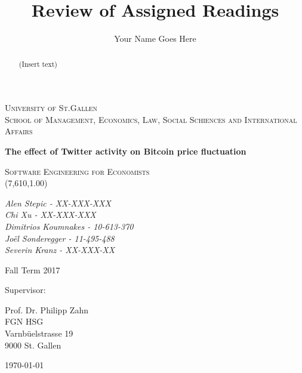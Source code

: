 \documentclass[a4paper,american,12pt]{article}
\title{Review of Assigned Readings}
\author{Your Name Goes Here}
\begin{document}
    \begin{titlepage}
    \centering
    {\scshape\LARGE University of St.Gallen \\ \large School of Management, Economics, Law, Social Schiences and International Affairs \par}
    \vspace{2.0cm}
    {\huge\bfseries The effect of Twitter activity on Bitcoin price fluctuation  \par}
	\vspace{2.0cm}
    {\scshape\Large Software Engineering for Economists \\(7,610,1.00) \par}
    \vspace{2.0cm}
    {\itshape\large Alen Stepic - XX-XXX-XXX \\Chi Xu - XX-XXX-XXX \\Dimitrios Koumnakes - 10-613-370 \\Joël Sonderegger - 11-495-488 \\Severin Kranz - XX-XXX-XX \par}
    	\begin{spacing}{1}
    	\vspace{1.2cm}
    	{Fall Term 2017 \par}
    	\vspace{1.2cm}
    	Supervisor:\\
    	{Prof. Dr. Philipp Zahn\\ FGN HSG\\ Varnbüelstrasse 19\\ 9000 St. Gallen \par} 
    	\end{spacing}
	\vfill
	{\large \today\par}
    \end{titlepage}
    
\clearpage
    
    \begin{abstract}
    	\begin{spacing}{1.5}
    	(Insert text)
    	\end{spacing}
    \end{abstract}

\clearpage

	\tableofcontents
\end{document}
